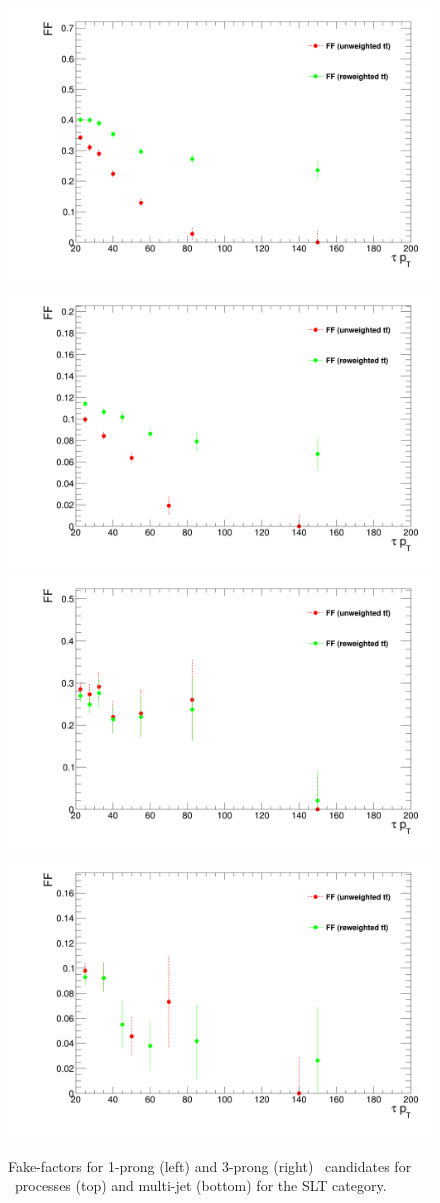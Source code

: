 \begin{figure}
\centering
\includegraphics[width=.4\textwidth]{DiHiggs/plots/FF_CRs/SLTttbarCR1p.png}
\includegraphics[width=.4\textwidth]{DiHiggs/plots/FF_CRs/SLTttbarCR3p.png} \\
\includegraphics[width=.4\textwidth]{DiHiggs/plots/FF_CRs/SLTInvCR1p.png}
\includegraphics[width=.4\textwidth]{DiHiggs/plots/FF_CRs/SLTInvCR3p.png}\\
\caption{Fake-factors for 1-prong (left) and 3-prong (right) \tauhad\ candidates for \ttbar\ processes (top) and multi-jet (bottom) for the \lephad SLT category.}
\label{fig:SLT_FF}
\end{figure}

